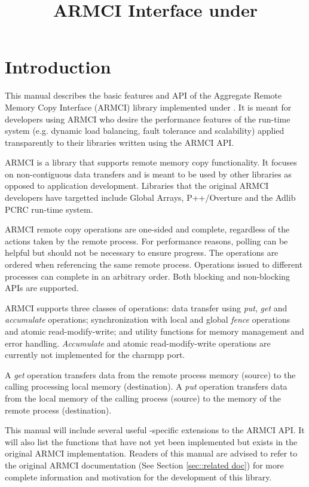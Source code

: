 \documentclass[10pt]{article}
\title{ARMCI Interface under \charmpp{}}
\begin{document}
\maketitle

\section{Introduction}
\label{sec::introduction}

This manual describes the basic features and API of the Aggregate
Remote Memory Copy Interface (ARMCI) library implemented under
\charmpp{}. It is meant for developers using ARMCI who desire the
performance features of the \charmpp{} run-time system (e.g. dynamic
load balancing, fault tolerance and scalability) applied transparently
to their libraries written using the ARMCI API.

ARMCI is a library that supports remote memory copy functionality. It
focuses on non-contiguous data transfers and is meant to be used by
other libraries as opposed to application development. Libraries that
the original ARMCI developers have targetted include Global Arrays,
P++/Overture and the Adlib PCRC run-time system.

ARMCI remote copy operations are one-sided and complete, regardless of
the actions taken by the remote process. For performance reasons,
polling can be helpful but should not be necessary to ensure
progress. The operations are ordered when referencing the same remote
process. Operations issued to different processes can complete in an
arbitrary order. Both blocking and non-blocking APIs are supported.

ARMCI supports three classes of operations: data transfer using {\em
put}, {\em get} and {\em accumulate} operations; synchronization with
local and global {\em fence} operations and atomic read-modify-write;
and utility functions for memory management and error handling. {\em
Accumulate} and atomic read-modify-write operations are currently not
implemented for the charmpp{} port.

A {\em get} operation transfers data from the remote process memory
(source) to the calling processing local memory (destination). A {\em
put} operation transfers data from the local memory of the calling
process (source) to the memory of the remote process (destination).

This manual will include several useful \charmpp{}-specific extensions to
the ARMCI API. It will also list the functions that have not yet been
implemented but exists in the original ARMCI implementation. Readers
of this manual are advised to refer to the original ARMCI
documentation (See Section \ref{sec::related doc}) for more complete
information and motivation for the development of this library.
\end{document}
